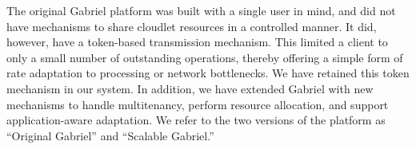 
The original Gabriel platform was built with a single user in mind, and did not
have mechanisms to share cloudlet resources in a controlled manner.  It did,
however, have a token-based transmission mechanism.  This limited a client to
only a small number of outstanding operations, thereby offering a simple form of
rate adaptation to processing or network bottlenecks.  We have retained this
token mechanism in our system. In addition, we have extended Gabriel with new
mechanisms to handle multitenancy, perform resource allocation, and support
application-aware adaptation.  We refer to the two versions of the platform as
``Original Gabriel'' and ``Scalable Gabriel.''








% 
% 
